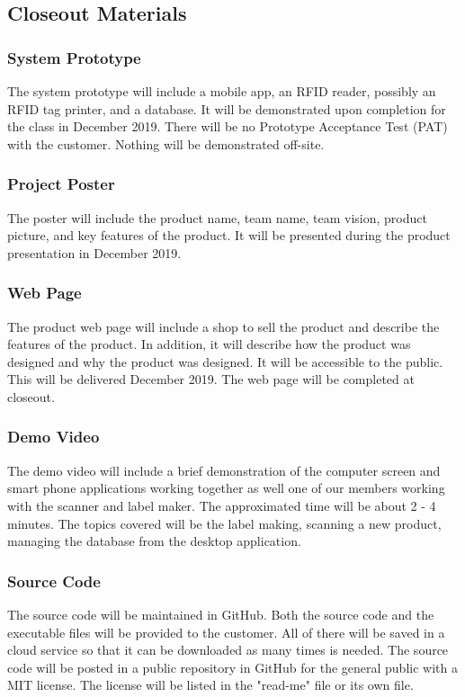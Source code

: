 \subsection{Closeout Materials}

\subsubsection{System Prototype}
The system prototype will include a mobile app, an RFID reader, possibly an RFID tag printer, and a database. It will be demonstrated upon completion for the class in December 2019. There will be no Prototype Acceptance Test (PAT) with the customer. Nothing will be demonstrated off-site.

\subsubsection{Project Poster}
The poster will include the product name, team name, team vision, product picture, and key features of the product. It will be presented during the product presentation in December 2019.

\subsubsection{Web Page}
The product web page will include a shop to sell the product and describe the features of the product. In addition, it will describe how the product was designed and why the product was designed. It will be accessible to the public. This will be delivered December 2019. The web page will be completed at closeout.

\subsubsection{Demo Video}
The demo video will include a brief demonstration of the computer screen and smart phone applications working together as well one of our members working with the scanner and label maker. The approximated time will be about 2 - 4 minutes. The topics covered will be the label making, scanning a new product, managing the database from the desktop application.

\subsubsection{Source Code}
The source code will be maintained in GitHub. Both the source code and the executable files will be provided to the customer. All of there will be saved in a cloud service so that it can be downloaded as many times is needed. The source code will be posted in a public repository in GitHub for the general public with a MIT license. The license will be listed in the "read-me" file or its own file.

